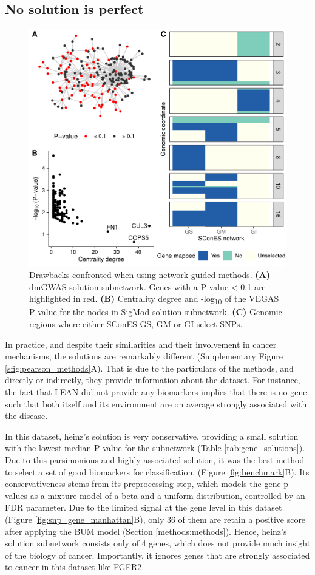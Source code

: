 \documentclass[twocolumn, 10pt]{article}
\begin{document}
\subsection{No solution is perfect}
\label{sec:orgc8f05c9}

\begin{figure}[htbp]
\centering
\includegraphics[width=.9\linewidth]{./figures/figure_2.pdf}
\caption{\label{fig:issues}
Drawbacks confronted when using network guided methods. \textbf{(A)} dmGWAS solution subnetwork. Genes with a P-value < 0.1 are highlighted in red. \textbf{(B)} Centrality degree and -log\textsubscript{10} of the VEGAS P-value for the nodes in SigMod solution subnetwork. \textbf{(C)} Genomic regions where either SConES GS, GM or GI select SNPs.}
\end{figure}

In practice, and despite their similarities and their involvement in cancer mechanisms, the solutions are remarkably different (Supplementary Figure \ref{sfig:pearson_methods}A). That is due to the particulars of the methods, and directly or indirectly, they provide information about the dataset. For instance, the fact that LEAN did not provide any biomarkers implies that there is no gene such that both itself and its environment are on average strongly associated with the disease. 

In this dataset, heinz's solution is very conservative, providing a small solution with the lowest median P-value for the subnetwork (Table \ref{tab:gene_solutions}). Due to this parsimonious and highly associated solution, it was the best method to select a set of good biomarkers for classification. (Figure \ref{fig:benchmark}B). Its conservativeness stems from its preprocessing step, which models the gene p-values as a mixture model of a beta and a uniform distribution, controlled by an FDR parameter. Due to the limited signal at the gene level in this dataset (Figure \ref{fig:snp_gene_manhattan}B), only 36 of them are retain a positive score after applying the BUM model (Section \ref{methods:methods}). Hence, heinz's solution subnetwork consists only of 4 genes, which does not provide much insight of the biology of cancer. Importantly, it ignores genes that are strongly associated to cancer in this dataset like FGFR2. 
\end{document}
